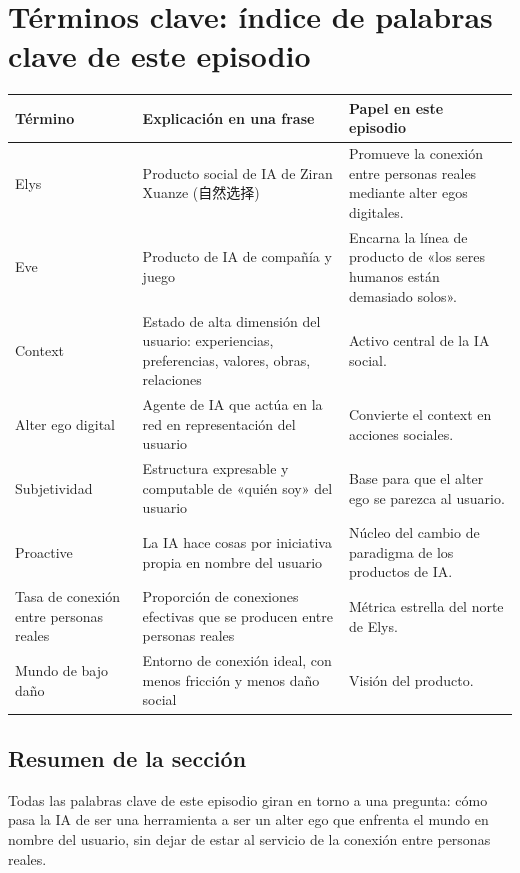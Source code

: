 \section{Términos clave: índice de palabras clave de este episodio}

\begin{longtable}{p{}p{}p{}}
\toprule
Término & Explicación en una frase & Papel en este episodio \\
\midrule
Elys & Producto social de IA de Ziran Xuanze (自然选择) & Promueve la conexión entre personas reales mediante alter egos digitales. \\
Eve & Producto de IA de compañía y juego & Encarna la línea de producto de «los seres humanos están demasiado solos». \\
Context & Estado de alta dimensión del usuario: experiencias, preferencias, valores, obras, relaciones & Activo central de la IA social. \\
Alter ego digital & Agente de IA que actúa en la red en representación del usuario & Convierte el context en acciones sociales. \\
Subjetividad & Estructura expresable y computable de «quién soy» del usuario & Base para que el alter ego se parezca al usuario. \\
Proactive & La IA hace cosas por iniciativa propia en nombre del usuario & Núcleo del cambio de paradigma de los productos de IA. \\
Tasa de conexión entre personas reales & Proporción de conexiones efectivas que se producen entre personas reales & Métrica estrella del norte de Elys. \\
Mundo de bajo daño & Entorno de conexión ideal, con menos fricción y menos daño social & Visión del producto. \\
\bottomrule
\end{longtable}

\subsection{Resumen de la sección}

Todas las palabras clave de este episodio giran en torno a una pregunta: cómo pasa la IA de ser una herramienta a ser un alter ego que enfrenta el mundo en nombre del usuario, sin dejar de estar al servicio de la conexión entre personas reales.
